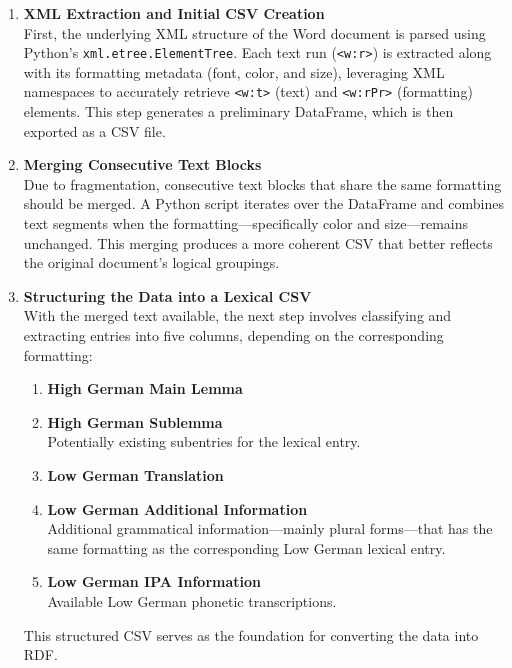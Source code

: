 \documentclass[11pt]{article}
\begin{document}
\begin{enumerate}
    \item \textsf{\textbf{XML Extraction and Initial CSV Creation}}\\  
    First, the underlying XML structure of the Word document is parsed using Python’s \texttt{xml.etree.ElementTree}. Each text run (\texttt{<w:r>}) is extracted along with its formatting metadata (font, color, and size), leveraging XML namespaces to accurately retrieve \texttt{<w:t>} (text) and \texttt{<w:rPr>} (formatting) elements. This step generates a preliminary DataFrame, which is then exported as a CSV file.

    \item \textsf{\textbf{Merging Consecutive Text Blocks}}\\  
    Due to fragmentation, consecutive text blocks that share the same formatting should be merged. A Python script iterates over the DataFrame and combines text segments when the formatting—specifically color and size—remains unchanged. This merging produces a more coherent CSV that better reflects the original document’s logical groupings.

    \item \textsf{\textbf{Structuring the Data into a Lexical CSV}}\\  
    With the merged text available, the next step involves classifying and extracting entries into five columns, depending on the corresponding formatting:
    \begin{enumerate}
        \item {\textbf{High German Main Lemma}}
        \item {\textbf{High German Sublemma}}\\Potentially existing subentries for the lexical entry.
        \item {\textbf{Low German Translation}}
        \item {\textbf{Low German Additional Information}}\\ Additional grammatical information—mainly plural forms—that has the same formatting as the corresponding Low German lexical entry.
        \item {\textbf{Low German IPA Information}}\\Available Low German phonetic transcriptions.
    \end{enumerate}
    This structured CSV serves as the foundation for converting the data into RDF.


\end{enumerate}
\end{document}
